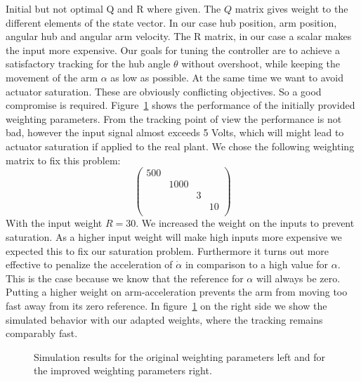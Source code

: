 \documentclass[ twoside,openright,titlepage,numbers=noenddot,headinclude,%
                footinclude=true,cleardoublepage=empty,abstractoff, %
                BCOR=5mm,paper=a4,fontsize=11pt,%
                ngerman,american,%
                ]{scrreprt}
\begin{document}
Initial but not optimal Q and R where given.  The $Q$ matrix gives weight to the different elements of the state vector. In our case hub position, arm position, angular hub and angular arm velocity. The R matrix, in our case a scalar makes the input more expensive. Our goals for tuning the controller are to achieve a satisfactory tracking for the hub angle $\theta$ without overshoot, while keeping the movement of the arm $\alpha$ as low as possible. At the same time we want to avoid actuator saturation. These are obviously conflicting objectives. So a good compromise is required. Figure~\ref{fig:stepResponse} shows the performance of the initially provided weighting parameters. From the tracking point of view the performance is not bad, however the input signal almost exceeds 5 Volts, which will might lead to actuator saturation if applied to the real plant. We chose the following weighting matrix to fix this problem:
\begin{equation}
\begin{pmatrix}
500 &		&	&	\\
	&1000	&	&	\\
	&	&3	&	\\
	&	&	&10	\\
\end{pmatrix}
\end{equation}
With the input weight $R = 30$. We increased the weight on the inputs to prevent saturation. As a higher input weight will make high inputs more expensive we expected this to fix our saturation problem. Furthermore it turns out more effective to penalize the acceleration of $\dot{\alpha}$ in comparison to a high value for $\alpha$. This is the case because we know that the reference for $\alpha$ will always be zero. Putting a higher weight on arm-acceleration prevents the arm from moving too fast away from its zero reference. In figure~\ref{fig:stepResponse} on the right side we show the simulated behavior with our adapted weights, where the tracking remains comparably fast. 


\begin{figure}


\caption{Simulation results for the original weighting parameters left and for the improved weighting parameters right.}
\label{fig:stepResponse}
\end{figure}
\end{document}
